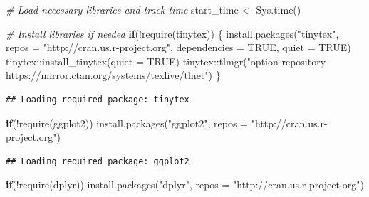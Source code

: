 \documentclass[
]{article}
\newenvironment{Shaded}{}{}
\newcommand{\AttributeTok}[1]{\textcolor[rgb]{0.49,0.56,0.16}{#1}}
\newcommand{\CommentTok}[1]{\textcolor[rgb]{0.38,0.63,0.69}{\textit{#1}}}
\newcommand{\ConstantTok}[1]{\textcolor[rgb]{0.53,0.00,0.00}{#1}}
\newcommand{\ControlFlowTok}[1]{\textcolor[rgb]{0.00,0.44,0.13}{\textbf{#1}}}
\newcommand{\FunctionTok}[1]{\textcolor[rgb]{0.02,0.16,0.49}{#1}}
\newcommand{\NormalTok}[1]{#1}
\newcommand{\OtherTok}[1]{\textcolor[rgb]{0.00,0.44,0.13}{#1}}
\newcommand{\SpecialCharTok}[1]{\textcolor[rgb]{0.25,0.44,0.63}{#1}}
\newcommand{\StringTok}[1]{\textcolor[rgb]{0.25,0.44,0.63}{#1}}
\begin{document}
\begin{Shaded}
\begin{Highlighting}[]
\CommentTok{\# Load necessary libraries and track time}
\NormalTok{start\_time }\OtherTok{\textless{}{-}} \FunctionTok{Sys.time}\NormalTok{()}

\CommentTok{\# Install libraries if needed}
\ControlFlowTok{if}\NormalTok{(}\SpecialCharTok{!}\FunctionTok{require}\NormalTok{(tinytex)) \{}
  \FunctionTok{install.packages}\NormalTok{(}\StringTok{"tinytex"}\NormalTok{, }\AttributeTok{repos =} \StringTok{"http://cran.us.r{-}project.org"}\NormalTok{, }
                   \AttributeTok{dependencies =} \ConstantTok{TRUE}\NormalTok{, }\AttributeTok{quiet =} \ConstantTok{TRUE}\NormalTok{)}
\NormalTok{  tinytex}\SpecialCharTok{::}\FunctionTok{install\_tinytex}\NormalTok{(}\AttributeTok{quiet =} \ConstantTok{TRUE}\NormalTok{)}
\NormalTok{  tinytex}\SpecialCharTok{::}\FunctionTok{tlmgr}\NormalTok{(}\StringTok{"option repository https://mirror.ctan.org/systems/texlive/tlnet"}\NormalTok{)}
\NormalTok{\}}
\end{Highlighting}
\end{Shaded}

\begin{verbatim}
## Loading required package: tinytex
\end{verbatim}

\begin{Shaded}
\begin{Highlighting}[]
\ControlFlowTok{if}\NormalTok{(}\SpecialCharTok{!}\FunctionTok{require}\NormalTok{(ggplot2)) }\FunctionTok{install.packages}\NormalTok{(}\StringTok{"ggplot2"}\NormalTok{, }
                                     \AttributeTok{repos =} \StringTok{"http://cran.us.r{-}project.org"}\NormalTok{)}
\end{Highlighting}
\end{Shaded}

\begin{verbatim}
## Loading required package: ggplot2
\end{verbatim}

\begin{Shaded}
\begin{Highlighting}[]
\ControlFlowTok{if}\NormalTok{(}\SpecialCharTok{!}\FunctionTok{require}\NormalTok{(dplyr)) }\FunctionTok{install.packages}\NormalTok{(}\StringTok{"dplyr"}\NormalTok{, }
                                     \AttributeTok{repos =} \StringTok{"http://cran.us.r{-}project.org"}\NormalTok{)}
\end{Highlighting}
\end{Shaded}
\end{document}
